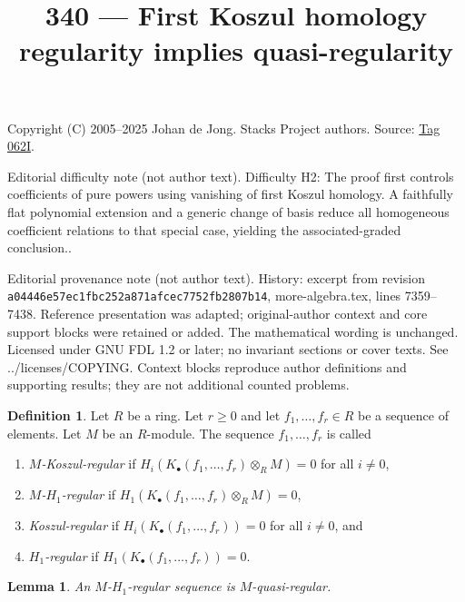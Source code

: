 \documentclass{amsart}
\theoremstyle{plain}
\newtheorem{lemma}[subsection]{Lemma}
\theoremstyle{definition}
\newtheorem{definition}[subsection]{Definition}
\theoremstyle{remark}
\numberwithin{equation}{subsection}
\begin{document}
\title[Stacks Project, Tag 062I]{340 --- First Koszul homology regularity implies quasi-regularity}
\maketitle
\noindent Copyright (C) 2005--2025 Johan de Jong. Stacks Project authors. Source: \href{https://stacks.math.columbia.edu/tag/062I}{Tag 062I}.

\noindent Editorial difficulty note (not author text). Difficulty H2: The proof first controls coefficients of pure powers using vanishing of first Koszul homology. A faithfully flat polynomial extension and a generic change of basis reduce all homogeneous coefficient relations to that special case, yielding the associated-graded conclusion..

\noindent Editorial provenance note (not author text). History: excerpt from revision \texttt{a0444\allowbreak 6e57e\allowbreak c1fbc\allowbreak 252a8\allowbreak 71afc\allowbreak ec775\allowbreak 2fb28\allowbreak 07b14}, more-algebra.tex, lines 7359--7438. Reference presentation was adapted; original-author context and core support blocks were retained or added. The mathematical wording is unchanged. Licensed under GNU FDL 1.2 or later; no invariant sections or cover texts. See ../licenses/COPYING. Context blocks reproduce author definitions and supporting results; they are not additional counted problems.

\begin{definition}
\label{definition-koszul-regular-sequence}
Let $R$ be a ring. Let $r \geq 0$ and let $f_1, \ldots, f_r \in R$
be a sequence of elements. Let $M$ be an $R$-module.
The sequence $f_1, \ldots, f_r$ is called
\begin{enumerate}
\item {\it $M$-Koszul-regular} if
$H_i(K_\bullet(f_1, \ldots, f_r) \otimes_R M) = 0$ for
all $i \not = 0$,
\item {\it $M$-$H_1$-regular} if
$H_1(K_\bullet(f_1, \ldots, f_r) \otimes_R M) = 0$,
\item {\it Koszul-regular} if $H_i(K_\bullet(f_1, \ldots, f_r)) = 0$ for
all $i \not = 0$, and
\item {\it $H_1$-regular} if $H_1(K_\bullet(f_1, \ldots, f_r)) = 0$.
\end{enumerate}
\end{definition}

\begin{lemma}
\label{lemma-H1-regular-quasi-regular}
An $M$-$H_1$-regular sequence is $M$-quasi-regular.
\end{lemma}
\end{document}
